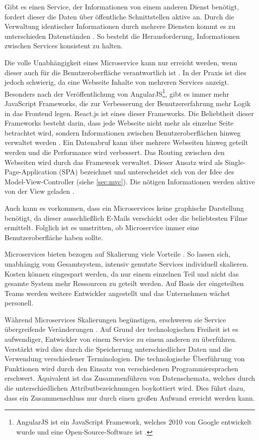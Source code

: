Gibt es einen Service, der Informationen von einem anderen Dienst benötigt, fordert dieser die Daten über öffentliche Schnittstellen aktive an. Durch die Verwaltung identischer Informationen durch mehrere Diensten kommt es zu unterschieden Datenständen \parencite[vgl.][Kap. 4.1]{wolff_microservices_2018}. So besteht die Herausforderung, Informationen zwischen Services konsistent zu halten.

Die volle Unabhängigkeit eines Microservice kann nur erreicht werden, wenn dieser auch für die Benutzeroberfläche verantwortlich ist \parencite[vgl.][Kap. 4.4]{wolff_microservices_2018}. In der Praxis ist dies jedoch schwierig, da eine Webseite Inhalte von mehreren Services anzeigt. Besonders nach der Veröffentlichung von AngularJS\footnote{AngularJS ist ein JavaScript Framework, welches 2010 von Google entwickelt wurde und eine Open-Source-Software ist \parencite{angularjs}.}, gibt es immer mehr JavaScript Frameworks, die zur Verbesserung der Benutzererfahrung mehr Logik in das Frontend legen. React.js ist eines dieser Frameworks.
Die Beliebtheit dieser Frameworks besteht darin, dass jede Webseite nicht mehr als einzelne Seite betrachtet wird, sondern Informationen zwischen Benutzeroberflächen hinweg verwaltet werden \parencite[vgl.][Kap. 9.1]{wolff_microservices_2018}. Ein Datenabruf kann über mehrere Webseiten hinweg geteilt werden und die Performance wird verbessert. Das Routing zwischen den Webseiten wird durch das Framework verwaltet. Dieser Ansatz wird als Single-Page-Application (SPA) bezeichnet und unterscheidet sich von der Idee des Model-View-Controller (siehe \cref{sec:mvc}). Die nötigen Informationen werden aktive von der View geladen \parencite{single-page-webanwendung_2019}.

Auch kann es vorkommen, dass ein Microservices keine graphische Darstellung benötigt, da dieser ausschließlich E-Mails verschickt oder die beliebtesten Filme ermittelt. Folglich ist es umstritten, ob Microservice immer eine Benutzeroberfläche haben sollte.

Microservices bieten bezogen auf Skalierung viele Vorteile \parencite[vgl.][Kap. 2.1.4]{newman_monolith_2019}. So lassen sich, unabhängig vom Gesamtsystem, intensiv genutzte Services individuell skalieren. Kosten können eingespart werden, da nur einem einzelnen Teil und nicht das gesamte System mehr Ressourcen zu geteilt werden. Auf Basis der eingeteilten Teams werden weitere Entwickler angestellt und das Unternehmen wächst personell.

Während Microservices Skalierungen begünstigen, erschweren sie Service übergreifende Veränderungen \parencite[vgl.][Kap. 2.15]{newman_monolith_2019}. Auf Grund der technologischen Freiheit ist es aufwendiger, Entwickler von einem Service zu einem anderen zu überführen. Verstärkt wird dies durch die Speicherung unterschiedlicher Daten und die Verwendung verschiedener Terminologien. Die technologische Überführung von Funktionen wird durch den Einsatz von verschiedenen Programmiersprachen erschwert. Äquivalent ist das Zusammenführen von Datenschemata, welches durch die unterschiedlichen Attributbezeichnungen boykottiert wird. Dies führt dazu, dass ein Zusammenschluss nur durch einen großen Aufwand erreicht werden kann.


